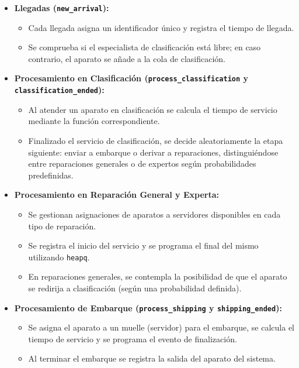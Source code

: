 \documentclass[a4paper,12pt]{article}
\begin{document}
\begin{itemize}[leftmargin=2cm]
    \item \textbf{Llegadas (\texttt{new\_arrival}):}
    \begin{itemize}
        \item Cada llegada asigna un identificador único y registra el tiempo de llegada.
        \item Se comprueba si el especialista de clasificación está libre; en caso contrario, el aparato se añade a la cola de clasificación.
    \end{itemize}
    \item \textbf{Procesamiento en Clasificación (\texttt{process\_classification} y \texttt{classification\_ended}):}
    \begin{itemize}
        \item Al atender un aparato en clasificación se calcula el tiempo de servicio mediante la función correspondiente.
        \item Finalizado el servicio de clasificación, se decide aleatoriamente la etapa siguiente: enviar a embarque o derivar a reparaciones, distinguiéndose entre reparaciones generales o de expertos según probabilidades predefinidas.
    \end{itemize}
    \item \textbf{Procesamiento en Reparación General y Experta:}
    \begin{itemize}
        \item Se gestionan asignaciones de aparatos a servidores disponibles en cada tipo de reparación.
        \item Se registra el inicio del servicio y se programa el final del mismo utilizando \texttt{heapq}.
        \item En reparaciones generales, se contempla la posibilidad de que el aparato se redirija a clasificación (según una probabilidad definida).
    \end{itemize}
    \item \textbf{Procesamiento de Embarque (\texttt{process\_shipping} y \texttt{shipping\_ended}):}
    \begin{itemize}
        \item Se asigna el aparato a un muelle (servidor) para el embarque, se calcula el tiempo de servicio y se programa el evento de finalización.
        \item Al terminar el embarque se registra la salida del aparato del sistema.
    \end{itemize}
\end{itemize}
\end{document}
